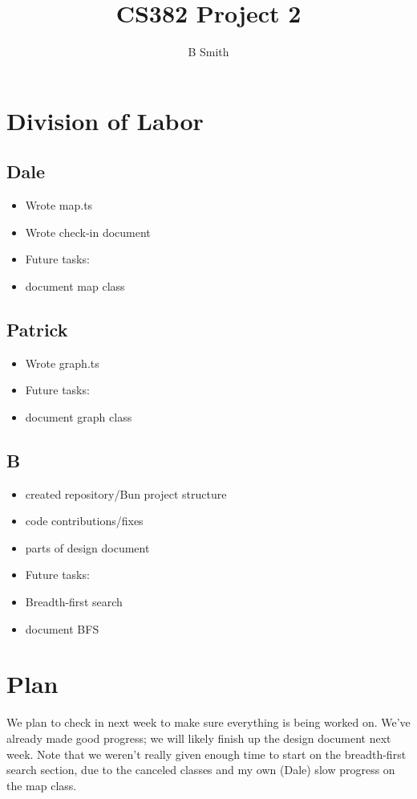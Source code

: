 \documentclass{homework}
\title{CS382 Project 2}
\author{B Smith}
\begin{document}
\maketitle
\tableofcontents

\section{Division of Labor}
\subsection{Dale}
\begin{itemize}
    \item Wrote map.ts
    \item Wrote check-in document
    \item Future tasks:
    \item document map class
\end{itemize}
\subsection{Patrick}
\begin{itemize}
    \item Wrote graph.ts
    \item Future tasks:
    \item document graph class
\end{itemize}
\subsection{B}
\begin{itemize}
    \item created repository/Bun project structure
    \item code contributions/fixes
    \item parts of design document
    \item Future tasks:
    \item Breadth-first search
    \item document BFS
\end{itemize}

\section{Plan}
We plan to check in next week to make sure everything is being worked on.
We've already made good progress; we will likely finish up the design document next week.
Note that we weren't really given enough time to start on the breadth-first search section, due to the canceled classes and my own (Dale) slow progress on the map class.
\end{document}
